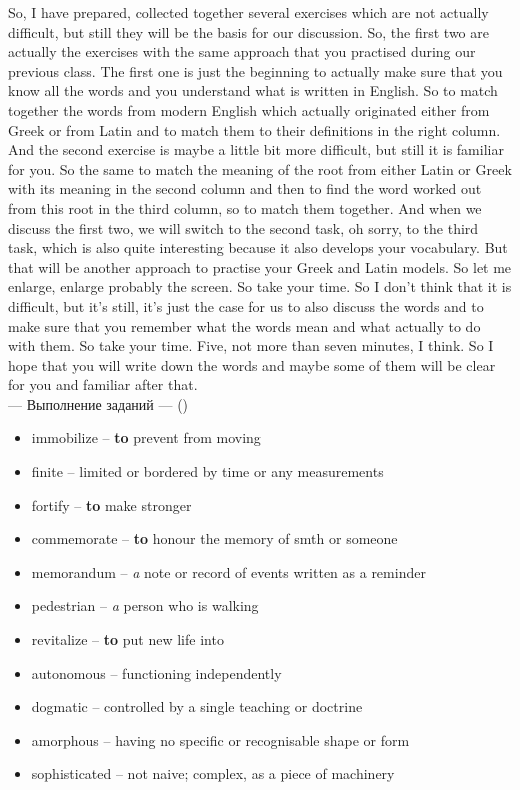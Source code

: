 \documentclass[main.tex]{subfiles}
\begin{document}
\newpage
{}

So, I have prepared, collected together several exercises which are not actually difficult, but still they will be the basis for our discussion.
So, the first two are actually the exercises with the same approach that you practised during our previous class.
The first one is just the beginning to actually make sure that you know all the words and you understand what is written in English.
So to match together the words from modern English which actually originated either from Greek or from Latin and to match them to their definitions in the right column.
And the second exercise is maybe a little bit more difficult, but still it is familiar for you.
So the same to match the meaning of the root from either Latin or Greek with its meaning in the second column and then to find the word worked out from this root in the third column, so to match them together.
And when we discuss the first two, we will switch to the second task, oh sorry, to the third task, which is also quite interesting because it also develops your vocabulary.
But that will be another approach to practise your Greek and Latin models.
So let me enlarge, enlarge probably the screen.
So take your time.
So I don't think that it is difficult, but it's still, it's just the case for us to also discuss the words and to make sure that you remember what the words mean and what actually to do with them.
So take your time.
Five, not more than seven minutes, I think.
So I hope that you will write down the words and maybe some of them will be clear for you and familiar after that.
\\

\hypertarget{ltask:2023-11-29-1}{--- Выполнение заданий ---} (\hyperref[task:2023-11-29]{\color{blue}{перейти к тексту задания упр.2.6.1.}})
\\


\begin{itemize}[nosep,leftmargin=*,label={}]
	\itemsep\eitsp
	\item immobilize -- \textbf{to} prevent from moving
	\item finite -- limited or bordered by time or any measurements
	\item fortify -- \textbf{to} make stronger
	\item commemorate -- \textbf{to} honour the memory of smth or someone
	\item memorandum -- \textit{a} note or record of events written as a reminder
	\item pedestrian -- \textit{a} person who is walking
	\item revitalize -- \textbf{to} put new life into
	\item autonomous -- functioning independently
	\item dogmatic -- controlled by a single teaching or doctrine
	\item amorphous -- having no specific or recognisable shape or form
	\item sophisticated -- not naive; complex, as a piece of machinery
\end{itemize}
\ 
\end{document}
